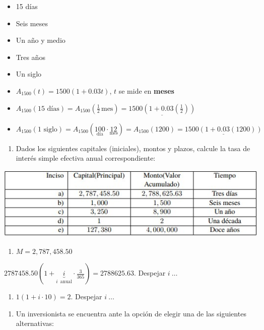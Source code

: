 \documentclass[
]{book}
\providecommand{\tightlist}{%
  \setlength{\itemsep}{0pt}\setlength{\parskip}{0pt}}
\theoremstyle{definition}
\theoremstyle{definition}
\theoremstyle{definition}
\theoremstyle{definition}
\theoremstyle{remark}
\begin{document}
\begin{itemize}
\item
  15 días
\item
  Seis meses
\item
  Un año y medio
\item
  Tres años
\item
  Un siglo
\item
  \(A_{1500}(t)=1500(1+0.03t)\), \(t\) se mide en \textbf{meses}
\item
  \(A_{1500}(\text{15 días}) = A_{1500}\left( \frac{1}{2} \, \text{mes}\right)= \underline{1500\left(1+0.03\left( \frac{1}{2}\right) \right)}\)
\item
  \(A_{1500}(\text{1 siglo}) = A_{1500}\left(\underset{\text{día}}{100} \cdot \underset{\text{mes}}{12}\right)=A_{1500}(1200) = \underline{1500(1+0.03(1200))}\)
\end{itemize}

\begin{enumerate}
\def\labelenumi{\arabic{enumi}.}
\setcounter{enumi}{2}
\tightlist
\item
  Dados los siguientes capitales (iniciales), montos y plazos, calcule la tasa de interés simple efectiva anual correspondiente:
\end{enumerate}

\includegraphics{images/6.jpg}

\begin{enumerate}
\def\labelenumi{\alph{enumi})}
\tightlist
\item
  \(M = 2,787,458.50\)
\end{enumerate}

\(2787458.50\left( 1+\underbrace{i}_{i\,\text{ anual}} \cdot \frac{3}{365}\right) = 2788625.63\). Despejar \(i \: \ldots\)

\begin{enumerate}
\def\labelenumi{\alph{enumi}.}
\setcounter{enumi}{3}
\tightlist
\item
  \(1(1+i\cdot 10) = 2\). Despejar \(i\: \ldots\)
\end{enumerate}

\begin{enumerate}
\def\labelenumi{\arabic{enumi}.}
\setcounter{enumi}{10}
\tightlist
\item
  Un inversionista se encuentra ante la opción de elegir una de las siguientes alternativas:
\end{enumerate}
\end{document}
